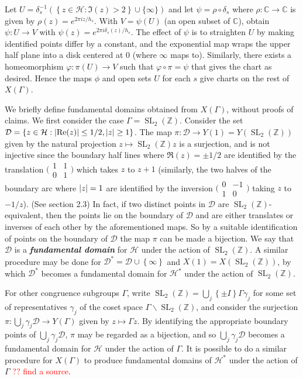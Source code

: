 \documentclass[10pt,leqno,twoside]{article}
\theoremstyle{plain}
\theoremstyle{definition}
\numberwithin{equation}{section}
\numberwithin{lem}{section}
\newcommand{\cbr}[1]{\left\{#1\right\}}
\newcommand{\textib}[1]{\textbf{\textit{#1\index{#1}}}} %
\DeclareMathOperator{\SL}{SL}
\newcommand{\slz}{\SL_2(\mathbb{Z})}
\newcommand{\sai}[1]{\textcolor{red}{#1}}
\begin{document}
Let $U = \delta_s^{-1}(\cbr{z\in\mathcal H : \Im(z) > 2}\cup\{\infty\})$ and let $\psi = \rho\circ \delta_s$ where $\rho\colon \mathbb C\to\mathbb C$ is given by $\rho(z) = e^{2\pi i z/h_s}$. With $V = \psi(U)$ (an open subset of $\mathbb C$), obtain $\psi\colon U\to V$ with $\psi(z) = e^{2\pi i \delta_s(z)/h_s}$. The effect of $\psi$ is to straighten $U$ by making identified points differ by a constant, and the exponential map wraps the upper half plane into a disk centered at $0$ (where $\infty$ maps to). Similarly, there exists a homeomorphism $\varphi\colon \pi(U)\to V$ such that $\varphi\circ\pi = \psi$ that gives the chart as desired. Hence the maps $\phi$ and open sets $U$ for each $s$ give charts on the rest of $X(\varGamma)$.

We briefly define fundamental domains obtained from $X(\varGamma)$, without proofs of claims. We first consider the case $\varGamma = \slz$. Consider the set $\mathcal D = \cbr{z\in\mathcal H : \abs{\Re(z)}\leq 1/2,\abs{z}\geq 1}$. The map $\pi\colon\mathcal D\to Y(1) = Y(\slz)$ given by the natural projection $z\mapsto \slz z$ is a surjection, and is not injective since the boundary half lines where $\Re(z) = \pm 1/2$ are identified by the translation $\big(\!\begin{smallmatrix}
    1 & 1 \\ 0 & 1
\end{smallmatrix}\!\big)$ which takes $z$ to $z+1$ (similarly, the two halves of the boundary arc where $\abs{z} = 1$ are identified by the inversion $\big(\!\begin{smallmatrix}
    0 & -1 \\ 1 & 0
\end{smallmatrix}\!\big)$ taking $z$ to $-1/z$). (See \cite{diamond} section 2.3) In fact, if two distinct points in $\mathcal D$ are $\slz$-equivalent, then the points lie on the boundary of $\mathcal D$ and are either translates or inverses of each other by the aforementioned maps. So by a suitable identification of points on the boundary of $\mathcal D$ the map $\pi$ can be made a bijection. We say that $\mathcal D$ is a \textib{fundamental domain} for $\mathcal H$ under the action of $\slz$. A similar procedure may be done for $\mathcal D^\ast = \mathcal D \cup\cbr{\infty}$ and $X(1) = X(\slz)$, by which $\mathcal D^\ast$ becomes a fundamental domain for $\mathcal H^\ast$ under the action of $\slz$. 

For other congruence subgroups $\varGamma$, write $\slz = \bigcup_j \cbr{\pm I}\varGamma \gamma_j$ for some set of representatives $\gamma_j$ of the coset space $\varGamma\backslash \slz$, and consider the surjection $\pi\colon \bigcup_j \gamma_j\mathcal D\to Y(\varGamma)$ given by $z\mapsto \varGamma z$. By identifying the appropriate boundary points of $\bigcup_j \gamma_j\mathcal D$, $\pi$ may be regarded as a bijection, and so $\bigcup_j \gamma_j\mathcal D$ becomes a fundamental domain for $\mathcal H$ under the action of $\varGamma$. It is possible to do a similar procedure for $X(\varGamma)$ to produce fundamental domains of $\mathcal H^\ast$ under the action of $\varGamma$ \sai{?? find a source}. 
\end{document}
